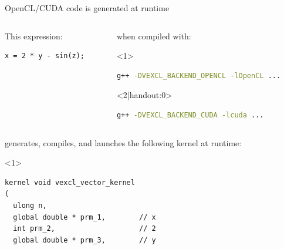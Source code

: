 \documentclass[@BEAMER_OPTIONS@]{beamer}
\begin{document}

\begin{frame}[fragile]{OpenCL/CUDA code is generated at runtime}
    \begin{columns}
        \begin{column}{0.38\textwidth}
            \begin{exampleblock}{This expression:}
                \begin{lstlisting}
x = 2 * y - sin(z);
                \end{lstlisting}
            \end{exampleblock}
        \end{column}
        \begin{column}{0.55\textwidth}
            \begin{exampleblock}{when compiled with:}
                \begin{onlyenv}<1>
                    \begin{lstlisting}[language=bash,numbers=none]
g++ -DVEXCL_BACKEND_OPENCL -lOpenCL ...
                    \end{lstlisting}
                \end{onlyenv}
                \begin{onlyenv}<2|handout:0>
                    \begin{lstlisting}[language=bash,numbers=none]
g++ -DVEXCL_BACKEND_CUDA -lcuda ...
                    \end{lstlisting}
                \end{onlyenv}
            \end{exampleblock}
        \end{column}
    \end{columns}
    \begin{exampleblock}{generates, compiles, and launches the following kernel
        at runtime:}
        \begin{onlyenv}<1>
            \begin{lstlisting}
kernel void vexcl_vector_kernel
(
  ulong n,
  global double * prm_1,        // x
  int prm_2,                    // 2
  global double * prm_3,        // y

\end{lstlisting}
\end{onlyenv}
\end{exampleblock}
\end{frame}
\end{document}
